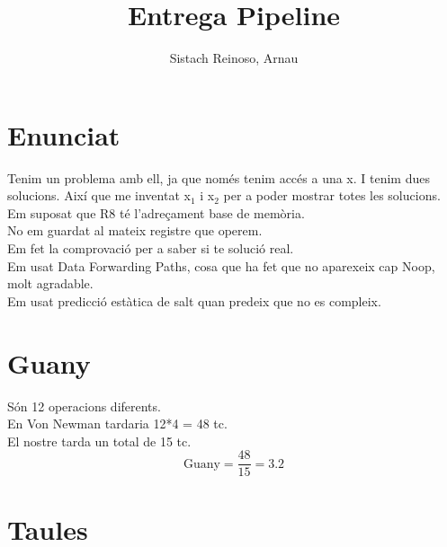 \documentclass{article}
\title{Entrega Pipeline}
\author{Sistach Reinoso, Arnau}
\begin{document}
\maketitle
\newpage
\tableofcontents
\newpage
\section{Enunciat}
Tenim un problema amb ell, ja que només tenim accés a una x. I tenim dues solucions. Així que me inventat x$_1$ i x$_2$ per a poder mostrar totes les solucions.\\
Em suposat que R8 té l'adreçament base de memòria.\\
No em guardat al mateix registre que operem.\\
Em fet la comprovació per a saber si te solució real.\\
Em usat Data Forwarding Paths, cosa que ha fet que no aparexeix cap Noop, molt agradable.\\
Em usat predicció estàtica de salt quan predeix que no es compleix.

\section{Guany}
Són 12 operacions diferents.\\
En Von Newman tardaria 12*4 = 48 tc.\\
El nostre tarda un total de 15 tc.\\
$$\text{Guany} = \frac{48}{15} = 3.2$$

\section{Taules}
\end{document}

